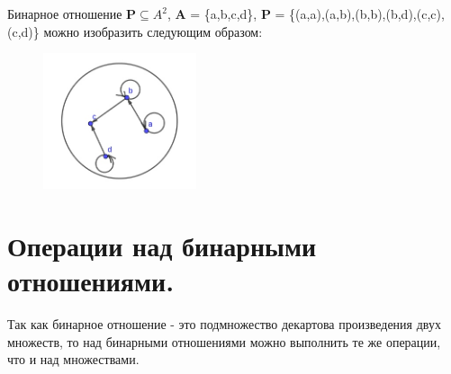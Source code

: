 \documentclass[12pt, a4paper, oneside]{article}
\theoremstyle{plain} %
\theoremstyle{definition}
\begin{document}
Бинарное отношение $\textbf{P} \subseteq A^2$, \textbf{A} = \{a,b,c,d\}, \textbf{P} = \{(a,a),(a,b),(b,b),(b,d),(c,c),(c,d)\} можно изобразить следующим образом:

\begin{figure}[h!] %
\centering
\includegraphics[width=0.4\textwidth]{dfgh.jpg}
\end{figure}

\section{Операции над бинарными отношениями.}
Так как бинарное отношение - это подмножество декартова произведения двух множеств, то над бинарными отношениями можно выполнить те же операции, что и над множествами.\par
\end{document}
